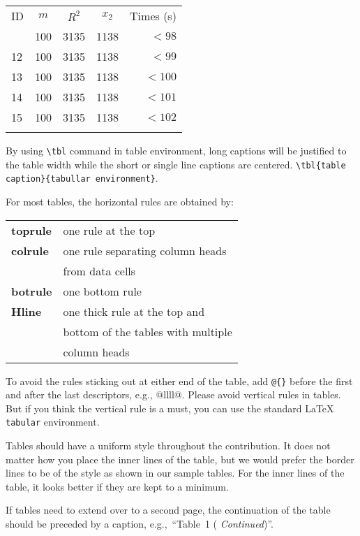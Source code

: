 \documentclass{ws-bme}
\begin{document}
\begin{multicols}{2}
\begin{tablehere}%
{\begin{tabular}{@{}lcccr@{}}
\toprule
ID & $m$ & $R^2$ & $x_2$ & Times (s)\\ \colrule
11 & 100 & 3135 & 1138 & $<98$\\
12 & 100 & 3135 & 1138 & $<99$\\
13 & 100 & 3135 & 1138 & $<100$\\
14 & 100 & 3135 & 1138 & $<101$\\
15 & 100 & 3135 & 1138 & $<102$\\ \botrule
\end{tabular}}\label{tab:smtab}
\end{tablehere}

By using \verb|\tbl| command in table environment, long captions will be justified to the table width while the short or single line captions are centered.
\verb|\tbl{table caption}{tabullar environment}|.

For most tables, the horizontal rules are obtained by:

\begin{tabular}{ll}
{\bf toprule} & one rule at the top\\
{\bf colrule}& one rule separating column heads\\ & from data cells\\
{\bf botrule}& one bottom rule\\
{\bf Hline} & one thick rule at the top and\\ & bottom of the tables with multiple\\& column heads\\
\end{tabular}

To avoid the rules sticking out at either end
of the table, add \verb|@{}| before the first and after the last descriptors, e.g., {@{}llll@{}}. Please avoid vertical rules in tables.
But if you think the vertical rule is a must,
you can use the standard \LaTeX{} \verb|tabular| environment.

Tables should have a uniform style throughout the
contribution. It does not matter how you place the
inner lines of the table, but we would prefer the border lines to be
of the style as shown in our sample tables.
For the inner lines of the table, it looks better
if they are kept to a minimum.

If tables need to extend over to a second page, the continuation
of the table should be preceded by a caption, e.g.,~``Table~1 ({\it
Continued})''.


\end{multicols}
\end{document}
